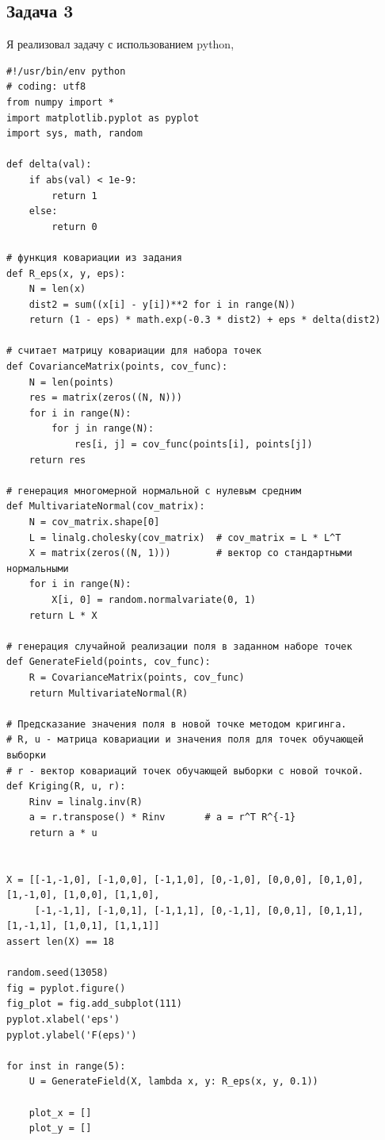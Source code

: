 \documentclass[a4paper, 12pt, onepage]{article}
\begin{document}
\subsection*{Задача 3}
Я реализовал задачу с использованием python, 
{
\footnotesize
\begin{verbatim}
#!/usr/bin/env python
# coding: utf8
from numpy import *
import matplotlib.pyplot as pyplot
import sys, math, random

def delta(val):
    if abs(val) < 1e-9:
        return 1
    else:
        return 0

# функция ковариации из задания
def R_eps(x, y, eps):
    N = len(x)
    dist2 = sum((x[i] - y[i])**2 for i in range(N))
    return (1 - eps) * math.exp(-0.3 * dist2) + eps * delta(dist2)

# считает матрицу ковариации для набора точек
def CovarianceMatrix(points, cov_func):
    N = len(points)
    res = matrix(zeros((N, N)))
    for i in range(N):
        for j in range(N):
            res[i, j] = cov_func(points[i], points[j])
    return res

# генерация многомерной нормальной с нулевым средним
def MultivariateNormal(cov_matrix):
    N = cov_matrix.shape[0]
    L = linalg.cholesky(cov_matrix)  # cov_matrix = L * L^T
    X = matrix(zeros((N, 1)))        # вектор со стандартными нормальными
    for i in range(N):
        X[i, 0] = random.normalvariate(0, 1)
    return L * X

# генерация случайной реализации поля в заданном наборе точек
def GenerateField(points, cov_func):
    R = CovarianceMatrix(points, cov_func)
    return MultivariateNormal(R)

# Предсказание значения поля в новой точке методом кригинга.
# R, u - матрица ковариации и значения поля для точек обучающей выборки
# r - вектор ковариаций точек обучающей выборки с новой точкой.
def Kriging(R, u, r):
    Rinv = linalg.inv(R)
    a = r.transpose() * Rinv       # a = r^T R^{-1}
    return a * u


X = [[-1,-1,0], [-1,0,0], [-1,1,0], [0,-1,0], [0,0,0], [0,1,0], [1,-1,0], [1,0,0], [1,1,0],
     [-1,-1,1], [-1,0,1], [-1,1,1], [0,-1,1], [0,0,1], [0,1,1], [1,-1,1], [1,0,1], [1,1,1]]
assert len(X) == 18

random.seed(13058)
fig = pyplot.figure()
fig_plot = fig.add_subplot(111)
pyplot.xlabel('eps')
pyplot.ylabel('F(eps)')

for inst in range(5):
    U = GenerateField(X, lambda x, y: R_eps(x, y, 0.1))

    plot_x = []
    plot_y = []


\end{verbatim}}
\end{document}
